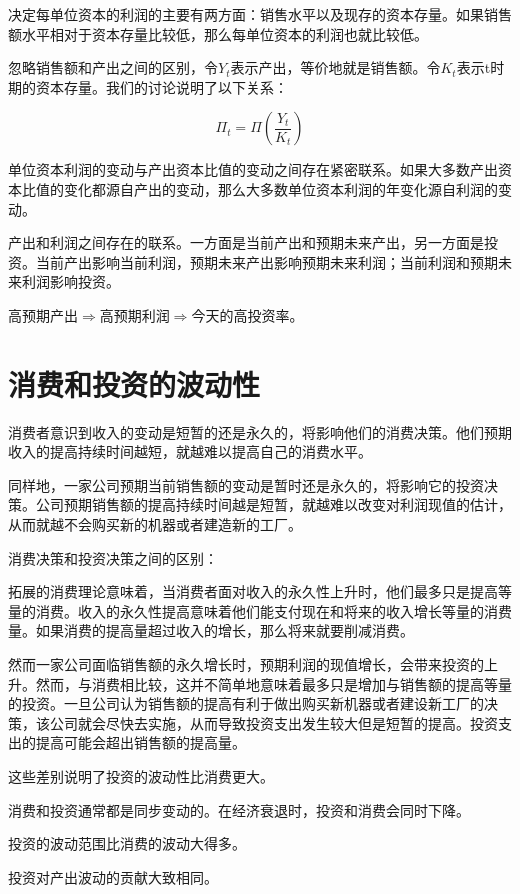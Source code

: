 \documentclass{article}
\begin{document}
决定每单位资本的利润的主要有两方面：销售水平以及现存的资本存量。如果销售额水平相对于资本存量比较低，那么每单位资本的利润也就比较低。

忽略销售额和产出之间的区别，令$ Y_t $表示产出，等价地就是销售额。令$ K_t $表示t时期的资本存量。我们的讨论说明了以下关系：

\[
\Pi_t=\Pi(\frac{Y_t}{K_t})
\]

单位资本利润的变动与产出资本比值的变动之间存在紧密联系。如果大多数产出资本比值的变化都源自产出的变动，那么大多数单位资本利润的年变化源自利润的变动。

产出和利润之间存在的联系。一方面是当前产出和预期未来产出，另一方面是投资。当前产出影响当前利润，预期未来产出影响预期未来利润；当前利润和预期未来利润影响投资。

高预期产出$ \Rightarrow $高预期利润$ \Rightarrow $今天的高投资率。

\section{消费和投资的波动性}

消费者意识到收入的变动是短暂的还是永久的，将影响他们的消费决策。他们预期收入的提高持续时间越短，就越难以提高自己的消费水平。

同样地，一家公司预期当前销售额的变动是暂时还是永久的，将影响它的投资决策。公司预期销售额的提高持续时间越是短暂，就越难以改变对利润现值的估计，从而就越不会购买新的机器或者建造新的工厂。

\hspace*{\fill}

消费决策和投资决策之间的区别：

拓展的消费理论意味着，当消费者面对收入的永久性上升时，他们最多只是提高等量的消费。收入的永久性提高意味着他们能支付现在和将来的收入增长等量的消费量。如果消费的提高量超过收入的增长，那么将来就要削减消费。

然而一家公司面临销售额的永久增长时，预期利润的现值增长，会带来投资的上升。然而，与消费相比较，这并不简单地意味着最多只是增加与销售额的提高等量的投资。一旦公司认为销售额的提高有利于做出购买新机器或者建设新工厂的决策，该公司就会尽快去实施，从而导致投资支出发生较大但是短暂的提高。投资支出的提高可能会超出销售额的提高量。

这些差别说明了投资的波动性比消费更大。

消费和投资通常都是同步变动的。在经济衰退时，投资和消费会同时下降。

投资的波动范围比消费的波动大得多。

投资对产出波动的贡献大致相同。








	
\end{document}
